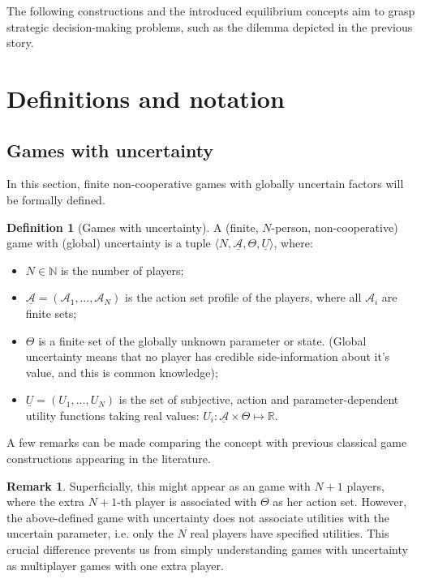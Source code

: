 \documentclass{article}
\theoremstyle{definition}
\newtheorem{definition}{Definition}[section]
\newtheorem*{remark}{Remark}
\begin{document}
The following constructions and the introduced equilibrium concepts aim to grasp strategic decision-making problems, such as the dilemma depicted in the previous story.

\section{Definitions and notation}

\subsection{Games with uncertainty}

In this section, finite non-cooperative games with globally uncertain factors will be formally defined.

\begin{definition}[Games with uncertainty]
\label{def:GameWithUncertainty}
A (finite, $N$-person, non-cooperative) game with (global) uncertainty is a tuple $\langle N, \underline{\mathcal{A}}, \Theta, \underline{U} \rangle$, where:

\begin{itemize}
    \item $N \in \mathbb{N}$ is the number of players;
    \item $\underline{\mathcal{A}} = (\mathcal{A}_1,\dots,\mathcal{A}_N)$ is the action set profile of the players, where all $\mathcal{A}_i$ are finite sets;
    \item $\Theta$ is a finite set of the globally unknown parameter or state. (Global uncertainty means that no player has credible side-information about it's value, and this is common knowledge);
    \item $\underline{U} = (U_1,\dots,U_N)$ is the set of subjective, action and parameter-dependent utility functions taking real values: $U_i : \underline{\mathcal{A}} \times \Theta \mapsto \mathbb{R}$.
\end{itemize}
    
\end{definition}

A few remarks can be made comparing the concept with previous classical game constructions appearing in the literature.

\begin{remark}
    Superficially, this might appear as an game with $N+1$ players, where the extra $N+1$-th player is associated with $\Theta$ as her action set. However, the above-defined game with uncertainty does not associate utilities with the uncertain parameter, i.e. only the $N$ real players have specified utilities. This crucial difference prevents us from simply understanding games with uncertainty as multiplayer games with one extra player.

\end{remark}
\end{document}
